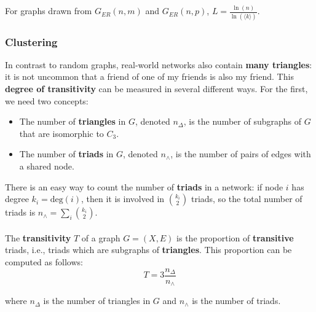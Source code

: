 \documentclass[a4paper,11pt]{article}
\begin{document}
For graphs drawn from $G_{ER}(n,m)$ and $G_{ER}(n,p)$, $L = \frac{\ln(n)}{\ln( \langle k \rangle)}$.

\subsubsection{Clustering}
In contrast to random graphs, real-world networks also contain \textbf{many triangles}: it is not uncommon that a friend of one of my friends is also my friend.
This \textbf{degree of transitivity} can be measured in several different ways.
For the first, we need two concepts:
\begin{itemize}
    \item   The number of \textbf{triangles} in $G$, denoted $n_\Delta$, is the number of subgraphs of $G$ that are isomorphic to $C_3$.
    \item   The number of \textbf{triads} in $G$, denoted $n_\land$, is the number of pairs of edges with a shared node.
\end{itemize}

There is an easy way to count the number of \textbf{triads} in a network:
if node $i$ has degree $k_i = \text{deg}(i)$, then it is involved in $\binom{k_i}{2}$ triads,
so the total number of triads is $n_\land = \sum_i \binom{k_i}{2}$.
\\\\
The \textbf{transitivity} $T$ of a graph $G = (X,E)$ is the proportion of \textbf{transitive} triads, i.e., triads which are subgraphs of \textbf{triangles}.
This proportion can be computed as follows:
\[
    T = 3 \frac{n_\Delta}{n_\land}
\]

where $n_\Delta$ is the number of triangles in $G$ and $n_\land$ is the number of triads. 
\end{document}
